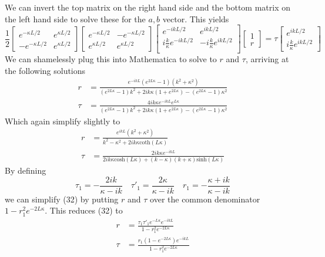\documentclass[]{book}
\begin{document}
We can invert the top matrix on the right hand side and the bottom matrix on the left hand side to solve these for the $a,b$ vector. This yields
\begin{equation}
\frac{1}{2}
\begin{bmatrix}
e^{-\kappa L/2} & e^{\kappa L/2} \\
-e^{-\kappa L/2} & e^{\kappa L/2}
\end{bmatrix}
\begin{bmatrix}
e^{-\kappa L/2} & -e^{-\kappa L/2} \\
e^{\kappa L/2} & e^{\kappa L/2}
\end{bmatrix}
\begin{bmatrix}
e^{-ikL/2} & e^{ikL/2} \\
i\frac{k}{\kappa}e^{-ikL/2} & -i\frac{k}{\kappa}e^{ikL/2} \\
\end{bmatrix}
\begin{bmatrix}
1\\
r
\end{bmatrix}
=
\tau\begin{bmatrix}
e^{ikL/2} \\
i\frac{k}{\kappa}e^{ikL/2}
\end{bmatrix}
\end{equation}
We can shamelessly plug this into Mathematica to solve to $r$ and $\tau$, arriving at the following solutions
\begin{equation}
\begin{split}
r & = \frac{e^{-ikL}(e^{2L\kappa}-1)(k^2+\kappa^2)}{(e^{2L\kappa}-1)k^2 + 2ik\kappa (1+e^{2L\kappa}) - (e^{2L\kappa}-1)\kappa^2} \\
\tau &= \frac{4ik\kappa e^{-ikL}e^{L\kappa}}{(e^{2L\kappa}-1)k^2+2ik\kappa (1+e^{2L\kappa})-(e^{2L\kappa}-1)\kappa^2}
\end{split}
\end{equation}
Which again simplify slightly to
\begin{equation}
\begin{split}
r &= \frac{e^{ikL}(k^2+\kappa^2)}{k^2-\kappa^2+2ik\kappa \textrm{coth}(L\kappa)} \\
\tau &= \frac{2ik\kappa e^{-ikL}}{2ik\kappa\textrm{cosh}(L\kappa)+(k-\kappa)(k+\kappa)\textrm{sinh}(L\kappa)}
\end{split}
\end{equation}
By defining
\begin{equation}
\tau_1=-\frac{2ik}{\kappa-ik} \quad \tau'_1=\frac{2\kappa}{\kappa-ik} \quad r_1=-\frac{\kappa + ik}{\kappa-ik}
\end{equation}
we can simplify (32) by putting $r$ and $\tau$ over the common denominator $1-r_1^2e^{-2L\kappa}$. This reduces (32) to
\begin{equation}
\begin{split}
r &= \frac{\tau_1\tau'_1 e^{-L\kappa}e^{-ikL}}{1-r_1^2e^{-2L\kappa}} \\
\tau &= \frac{r_1(1-e^{-2L\kappa})e^{-ikL}}{1-r_1^2e^{-2L\kappa}}
\end{split}
\end{equation}
\end{document}
